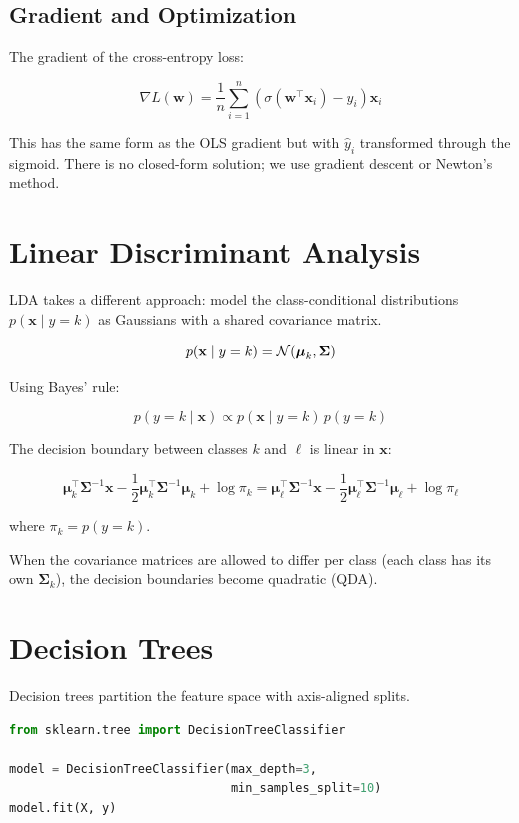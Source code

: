 \subsection{Gradient and Optimization}

The gradient of the cross-entropy loss:

\[
	\nabla L(\mathbf{w}) = \frac{1}{n} \sum_{i=1}^n (\sigma(\mathbf{w}^\top \mathbf{x}_i) - y_i) \mathbf{x}_i
\]

This has the same form as the OLS gradient but with $\hat{y}_i$ transformed through the sigmoid. There is no closed-form solution; we use gradient descent or Newton's method.

\section{Linear Discriminant Analysis}

LDA takes a different approach: model the class-conditional distributions $p(\mathbf{x} \mid y = k)$ as Gaussians with a shared covariance matrix.

\[
	p(\mathbf{x} \mid y = k) = \mathcal{N}(\boldsymbol{\mu}_k, \boldsymbol{\Sigma})
\]

Using Bayes' rule:

\[
	p(y = k \mid \mathbf{x}) \propto p(\mathbf{x} \mid y = k) \, p(y = k)
\]

The decision boundary between classes $k$ and $\ell$ is linear in $\mathbf{x}$:

\[
	\boldsymbol{\mu}_k^\top \boldsymbol{\Sigma}^{-1} \mathbf{x} - \frac12 \boldsymbol{\mu}_k^\top \boldsymbol{\Sigma}^{-1} \boldsymbol{\mu}_k + \log \pi_k = \boldsymbol{\mu}_\ell^\top \boldsymbol{\Sigma}^{-1} \mathbf{x} - \frac12 \boldsymbol{\mu}_\ell^\top \boldsymbol{\Sigma}^{-1} \boldsymbol{\mu}_\ell + \log \pi_\ell
\]

where $\pi_k = p(y = k)$.

When the covariance matrices are allowed to differ per class (each class has its own $\boldsymbol{\Sigma}_k$), the decision boundaries become quadratic (QDA).

\section{Decision Trees}

Decision trees partition the feature space with axis-aligned splits.

\begin{lstlisting}[language=Python, caption=Training a decision tree]
from sklearn.tree import DecisionTreeClassifier

model = DecisionTreeClassifier(max_depth=3,
                               min_samples_split=10)
model.fit(X, y)
\end{lstlisting}

